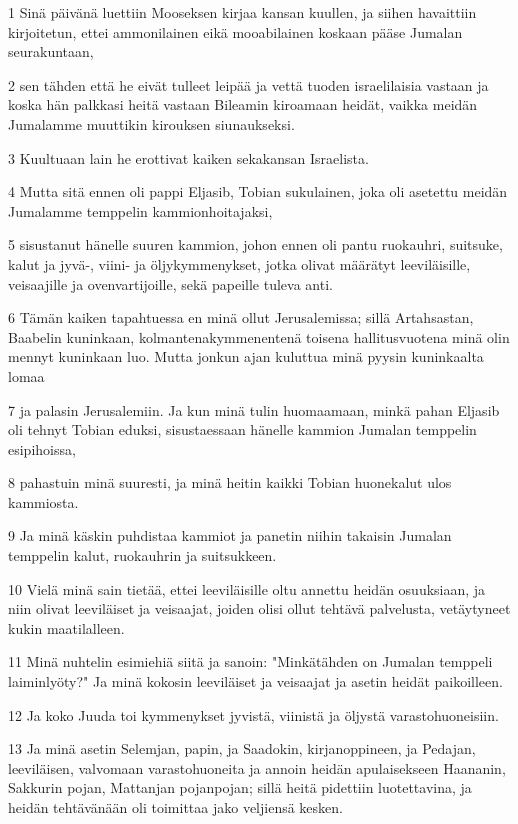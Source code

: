 \par 1 Sinä päivänä luettiin Mooseksen kirjaa kansan kuullen, ja siihen havaittiin kirjoitetun, ettei ammonilainen eikä mooabilainen koskaan pääse Jumalan seurakuntaan,
\par 2 sen tähden että he eivät tulleet leipää ja vettä tuoden israelilaisia vastaan ja koska hän palkkasi heitä vastaan Bileamin kiroamaan heidät, vaikka meidän Jumalamme muuttikin kirouksen siunaukseksi.
\par 3 Kuultuaan lain he erottivat kaiken sekakansan Israelista.
\par 4 Mutta sitä ennen oli pappi Eljasib, Tobian sukulainen, joka oli asetettu meidän Jumalamme temppelin kammionhoitajaksi,
\par 5 sisustanut hänelle suuren kammion, johon ennen oli pantu ruokauhri, suitsuke, kalut ja jyvä-, viini- ja öljykymmenykset, jotka olivat määrätyt leeviläisille, veisaajille ja ovenvartijoille, sekä papeille tuleva anti.
\par 6 Tämän kaiken tapahtuessa en minä ollut Jerusalemissa; sillä Artahsastan, Baabelin kuninkaan, kolmantenakymmenentenä toisena hallitusvuotena minä olin mennyt kuninkaan luo. Mutta jonkun ajan kuluttua minä pyysin kuninkaalta lomaa
\par 7 ja palasin Jerusalemiin. Ja kun minä tulin huomaamaan, minkä pahan Eljasib oli tehnyt Tobian eduksi, sisustaessaan hänelle kammion Jumalan temppelin esipihoissa,
\par 8 pahastuin minä suuresti, ja minä heitin kaikki Tobian huonekalut ulos kammiosta.
\par 9 Ja minä käskin puhdistaa kammiot ja panetin niihin takaisin Jumalan temppelin kalut, ruokauhrin ja suitsukkeen.
\par 10 Vielä minä sain tietää, ettei leeviläisille oltu annettu heidän osuuksiaan, ja niin olivat leeviläiset ja veisaajat, joiden olisi ollut tehtävä palvelusta, vetäytyneet kukin maatilalleen.
\par 11 Minä nuhtelin esimiehiä siitä ja sanoin: "Minkätähden on Jumalan temppeli laiminlyöty?" Ja minä kokosin leeviläiset ja veisaajat ja asetin heidät paikoilleen.
\par 12 Ja koko Juuda toi kymmenykset jyvistä, viinistä ja öljystä varastohuoneisiin.
\par 13 Ja minä asetin Selemjan, papin, ja Saadokin, kirjanoppineen, ja Pedajan, leeviläisen, valvomaan varastohuoneita ja annoin heidän apulaisekseen Haananin, Sakkurin pojan, Mattanjan pojanpojan; sillä heitä pidettiin luotettavina, ja heidän tehtävänään oli toimittaa jako veljiensä kesken.
